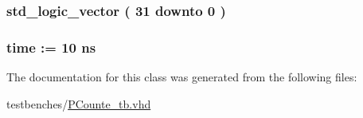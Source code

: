 \hypertarget{class_p_counte__tb_1_1behavior_a43d3d66618c7e36ea6b882156984c629}{
\subsubsection[{\-P\-C\-\_\-out}]{ {\bfseries std\-\_\-logic\-\_\-vector (   31    downto    0  ) } }}\label{class_p_counte__tb_1_1behavior_a43d3d66618c7e36ea6b882156984c629}
\hypertarget{class_p_counte__tb_1_1behavior_a84fbaa8d4f8539ee8577e4f05d006dfb}{
\subsubsection[{clk\-\_\-period}]{ {\bfseries time  \-:=  10  ns } }}\label{class_p_counte__tb_1_1behavior_a84fbaa8d4f8539ee8577e4f05d006dfb}


\-The documentation for this class was generated from the following files\-:\begin{DoxyCompactItemize}
\item 
testbenches/\hyperlink{_p_counte__tb_8vhd}{\-P\-Counte\-\_\-tb.\-vhd}\end{DoxyCompactItemize}
